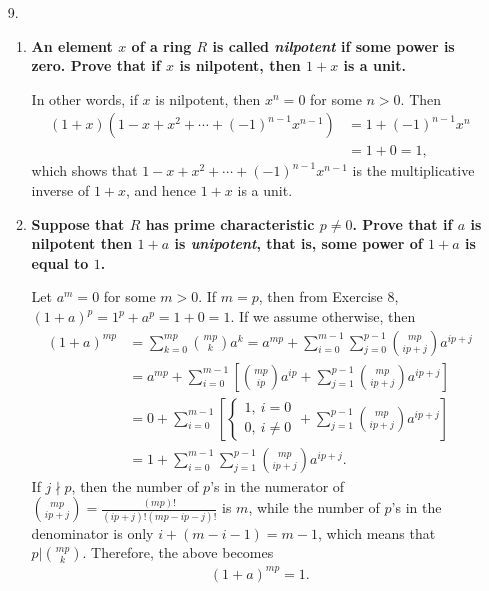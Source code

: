 \documentclass[a4paper,12pt]{article}
\begin{document}
\begin{enumerate}
    \item[9.]
        \begin{enumerate}
            \item
                \boldmath
                \textbf{An element $x$ of a ring $R$ is called \textit{nilpotent} if some power is zero. Prove that if $x$ is nilpotent, then $1 + x$ is a unit.} \par
                \unboldmath
                In other words, if $x$ is nilpotent, then $x^n = 0$ for some $n > 0$. Then
                \begin{align*}
                    (1 + x)(1 - x + x^2 + \cdots + (-1)^{n - 1} x^{n - 1}) &= 1 + (-1)^{n - 1} x^n \\
                    &= 1 + 0 = 1,
                \end{align*}
                which shows that $1 - x + x^2 + \cdots + (-1)^{n - 1} x^{n - 1}$ is the multiplicative inverse of $1 + x$, and hence $1 + x$ is a unit.

            \item
                \boldmath
                \textbf{Suppose that $R$ has prime characteristic $p \neq 0$. Prove that if $a$ is nilpotent then $1 + a$ is \textit{unipotent}, that is, some power of $1 + a$ is equal to $1$.} \par
                \unboldmath
                Let $a^m = 0$ for some $m > 0$. If $m = p$, then from Exercise 8, $(1 + a)^p = 1^p + a^p = 1 + 0 = 1$. If we assume otherwise, then
                \begin{align*}
                    (1 + a)^{mp} &= \sum_{k = 0}^{mp} \binom{mp}{k} a^k = a^{mp} + \sum_{i = 0}^{m - 1} \sum_{j = 0}^{p - 1} \binom{mp}{ip + j} a^{ip + j} \\
                    &= a^{mp} + \sum_{i = 0}^{m - 1} \left[ \binom{mp}{ip} a^{ip} + \sum_{j = 1}^{p - 1} \binom{mp}{ip + j} a^{ip + j} \right] \\
                    &= 0 + \sum_{i = 0}^{m - 1} \left[ \begin{cases}
                        1,\ i = 0 \\
                        0,\ i \neq 0
                    \end{cases} + \sum_{j = 1}^{p - 1} \binom{mp}{ip + j} a^{ip + j} \right] \\
                    &= 1 + \sum_{i = 0}^{m - 1} \sum_{j = 1}^{p - 1} \binom{mp}{ip + j} a^{ip + j}.
                \end{align*}
                If $j \nmid p$, then the number of $p$'s in the numerator of $\binom{mp}{ip + j} = \frac{(mp)!}{(ip + j)!(mp - ip - j)!}$ is $m$, while the number of $p$'s in the denominator is only $i + (m - i - 1) = m - 1$, which means that $p | \binom{mp}{k}$. Therefore, the above becomes
                \begin{align*}
                    (1 + a)^{mp} = 1.
                \end{align*}
        \end{enumerate}


\end{enumerate}
\end{document}
